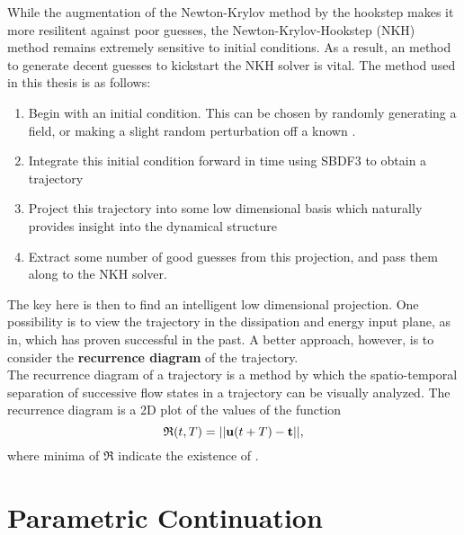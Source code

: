  While the augmentation of the Newton-Krylov method by the hookstep makes it more resilitent against poor guesses, the Newton-Krylov-Hookstep (NKH) method remains extremely sensitive to initial conditions. As a result, an method to generate decent guesses to kickstart the NKH solver is vital. The method used in this thesis is as follows:
 \begin{enumerate}
 \item Begin with an initial condition. This can be chosen by randomly generating a field, or making a slight random perturbation off a known \ecs.
 \item Integrate this initial condition forward in time using SBDF3 to obtain a trajectory 
 \item Project this trajectory into some low dimensional basis which naturally provides insight into the dynamical structure
 \item Extract some number of good guesses from this projection, and pass them along to the NKH solver.
 \end{enumerate}
 The key here is then to find an intelligent low dimensional projection. One possibility is to view the trajectory in the dissipation and energy input plane, as in, which has proven successful in the past. A better approach, however, is to consider the {\bf recurrence diagram} of the trajectory. \\
 
 The recurrence diagram of a trajectory is a method by which the spatio-temporal separation of successive flow states in a trajectory can be visually analyzed. The recurrence diagram is a 2D plot of the values of the function 
 \begin{equation}
 \mathfrak{R}(t,T) = ||\mathbf{u}(t+T) - \mathbf{t}||,
 \end{equation}
 where minima of $\mathfrak{R}$ indicate the existence of \ecs. 
 \section{Parametric Continuation} 
 

 
 
 